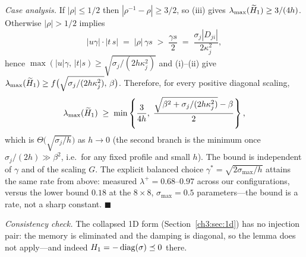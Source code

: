 \emph{Case analysis.}  If $|\rho|\le1/2$ then
$|\rho^{-1}-\rho|\ge3/2$, so (iii) gives $\lambda_{\max}(\widetilde{H}_1)\ge3/(4h)$.
Otherwise $|\rho|>1/2$ implies
\begin{equation}
  |u\gamma|\cdot|t\,s| \;=\; |\rho|\,\gamma s \;>\; \frac{\gamma s}{2}
  \;=\; \frac{\sigma_j|D_{ji}|}{2\kappa_j^{2}},
\end{equation}
hence
$\max(|u|\gamma,\,|t|s)\ge\sqrt{\sigma_j/(2h\kappa_j^{2})}$ and
(i)--(ii) give
$\lambda_{\max}(\widetilde{H}_1)\ge f\bigl(\sqrt{\sigma_j/(2h\kappa_j^{2})},\,\beta\bigr)$.
Therefore, for every positive diagonal scaling,
\begin{equation}
  \lamax(\Ht) \;\ge\; \min\left\{\frac{3}{4h},\;
  \frac{\sqrt{\beta^{2}+\sigma_j/(2h\kappa_j^{2})}-\beta}{2}\right\},
  \label{ch3:eq:appbound}
\end{equation}
which is $\Theta\bigl(\sqrt{\sigma_j/h}\bigr)$ as $h\to0$ (the second
branch is the minimum once $\sigma_j/(2h)\gg\beta^{2}$, i.e.\ for any
fixed profile and small $h$).  The bound is independent of $\gamma$ and
of the scaling $G$.  The explicit balanced choice
$\gamma^{*}=\sqrt{2\sigma_{\max}/h}$ attains the same rate from above:
measured $\lambda^{+}=0.68$--$0.97$ across our configurations, versus the
lower bound $0.18$ at the $8\times8$, $\sigma_{\max}=0.5$ parameters---the
bound is a rate, not a sharp constant. \hfill$\blacksquare$

\medskip
\emph{Consistency check.}  The collapsed 1D form
(Section~\ref{ch3:sec:1d}) has no injection pair: the memory is eliminated and
the damping is diagonal, so the lemma does not apply---and indeed
$H_1=-\operatorname{diag}(\sigma)\preceq0$ there.
